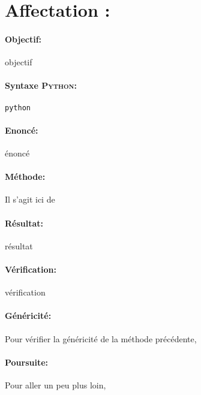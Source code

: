 \documentclass[11pt,a4paper,colorlinks,breaklinks]{article}
\def\python{\textsc{Python}}
\begin{document}

\newpage
\section{Affectation : }\label{arithmetique:affectation}
\paragraph{Objectif:} objectif

\paragraph{Syntaxe \python:} \texttt{python}

\begin{framed}
\paragraph{Enoncé:} énoncé
\end{framed}

\paragraph{Méthode:} Il s'agit ici de 

\paragraph{Résultat:} résultat

\paragraph{Vérification:} vérification

\paragraph{Généricité:} Pour vérifier la généricité de la méthode précédente,

\paragraph{Poursuite:} Pour aller un peu plus loin,

\end{document}
